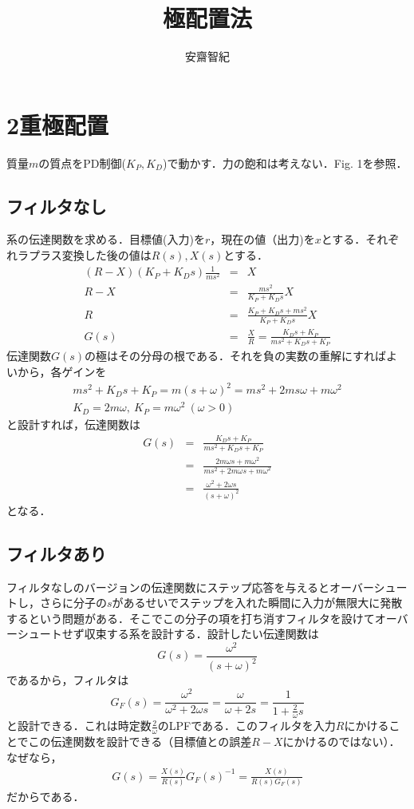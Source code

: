 \documentclass[11pt]{article} %
\title{極配置法}
\author{安齋智紀}
\begin{document}
\maketitle

\section{2重極配置}
質量$m$の質点をPD制御($K_P, K_D$)で動かす．力の飽和は考えない．Fig. 1を参照．
\subsection{フィルタなし}
系の伝達関数を求める．目標値(入力)を$r$，現在の値（出力)を$x$とする．それぞれラプラス変換した後の値は$R(s), X(s)$とする．
\begin{eqnarray}
	(R-X)(K_P + K_D s) \frac{1}{ms^2} &=& X \\
	R-X &=& \frac{ms^2}{K_P + K_D s} X \\
	R &=& \frac{K_P + K_D s + ms^2}{K_P + K_D s} X \\
	G(s) &=& \frac{X}{R} = \frac{K_D s + K_P}{ms^2 + K_D s + K_P}
\end{eqnarray}
伝達関数$G(s)$の極はその分母の根である．それを負の実数の重解にすればよいから，各ゲインを
\begin{eqnarray}
	ms^2 + K_D s + K_P = m(s+\omega)^2 = ms^2 + 2ms\omega + m\omega^2 \\
   K_D = 2m\omega, \ K_P = m\omega^2 \ (\omega > 0)
\end{eqnarray}
と設計すれば，伝達関数は
\begin{eqnarray}
	G(s) &=& \frac{K_D s + K_P}{ms^2 + K_D s + K_P} \\
			 &=& \frac{2m\omega s + m\omega^2}{ms^2 + 2m\omega s + m\omega^2} \\
         &=& \frac{\omega^2 + 2\omega s}{(s + \omega)^2}                   
\end{eqnarray}
となる．

\subsection{フィルタあり}
フィルタなしのバージョンの伝達関数にステップ応答を与えるとオーバーシュートし，さらに分子の$s$があるせいでステップを入れた瞬間に入力が無限大に発散するという問題がある．そこでこの分子の項を打ち消すフィルタを設けてオーバーシュートせず収束する系を設計する．設計したい伝達関数は
\begin{equation}
	G(s) = \frac{\omega^2}{(s+\omega)^2}
\end{equation}
であるから，フィルタは
\begin{equation}
	G_F(s) = \frac{\omega^2}{\omega^2 + 2\omega s} = \frac{\omega}{\omega + 2s} = \frac{1}{1 + \frac{2}{\omega}s}
\end{equation}
と設計できる．これは時定数$\frac{2}{\omega}$のLPFである．このフィルタを入力$R$にかけることでこの伝達関数を設計できる（目標値との誤差$R-X$にかけるのではない）．なぜなら，
\begin{eqnarray}
	G(s) = \frac{X(s)}{R(s)} G_F(s)^{-1} = \frac{X(s)}{R(s)G_F(s)} 
\end{eqnarray}
だからである．
\end{document}
